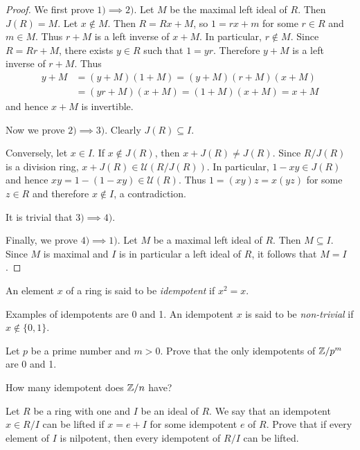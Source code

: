 \begin{proof}
    We first prove $1)\implies2)$. Let $M$ be the maximal left ideal of $R$. Then $J(R)=M$. 
    Let $x\not\in M$. Then $R=Rx+M$, so $1=rx+m$ for some $r\in R$ and $m\in M$. Thus  
    $r+M$ is a left inverse of $x+M$. In particular, 
    $r\not\in M$. Since $R=Rr+M$, there exists $y\in R$ such that $1=yr$. Therefore
    $y+M$ is a left inverse of $r+M$. Thus 
    \begin{align*}
    y+M&=(y+M)(1+M)=(y+M)(r+M)(x+M)\\
    &=(yr+M)(x+M)=(1+M)(x+M)=x+M
    \end{align*}
    and hence $x+M$ is invertible. 

    Now we prove $2)\implies3)$. Clearly $J(R)\subseteq I$. 
    
    Conversely, let $x\in I$. If $x\not\in J(R)$, then
    $x+J(R)\ne J(R)$. Since $R/J(R)$ is a division ring, 
    $x+J(R)\in\mathcal{U}(R/J(R))$. In particular, $1-xy\in J(R)$ and hence 
    $xy=1-(1-xy)\in\mathcal{U}(R)$. Thus $1=(xy)z=x(yz)$ for some $z\in R$ and therefore $x\not\in I$, a contradiction. 
    
    It is trivial that $3)\implies4)$. 

    Finally, we prove $4)\implies 1)$. 
    Let $M$ be a maximal left ideal of $R$. Then $M\subseteq I$. Since $M$ 
    is maximal and $I$ is in particular a left ideal of $R$, 
    it follows that $M=I$. 
\end{proof}

\begin{definition}
    An element $x$ of a ring is said to be \emph{idempotent} 
    if $x^2=x$.   
\end{definition}

Examples of idempotents are 0 and 1. 
An idempotent $x$ is said to be \emph{non-trivial} if $x\not\in\{0,1\}$. 

\begin{exercise}
\label{xca:idempotents_modpm}
    Let $p$ be a prime number and $m>0$. 
    Prove that the only idempotents of $\mathbb{Z}/p^m$ are 0 and 1. 
\end{exercise}


\begin{exercise}
    \label{xca:idempotents_modn}
    How many idempotent does $\mathbb{Z}/n$ have?
\end{exercise}

\begin{exercise}
\label{xca:lifting_idempotents}
    Let $R$ be a ring with one and $I$ be an ideal of $R$. 
    We say that an idempotent $x\in R/I$ can be lifted if $x=e+I$ for
    some idempotent $e$ of $R$. 
    Prove that if every element of $I$ is nilpotent, then every 
    idempotent of $R/I$ can be lifted. 
\end{exercise}

